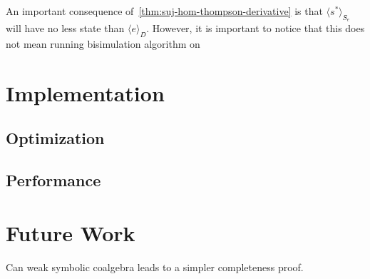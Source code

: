 \documentclass[conference]{IEEEtran}
\begin{document}
An important consequence of~\cref{thm:suj-hom-thompson-derivative} is that \(⟨s^*⟩_{Ŝ_{e}}\) will have no less state than \(⟨e⟩_{D̂}\).
However, it is important to notice that this does not mean running bisimulation algorithm on 

\section{Implementation}

\subsection{Optimization}\label{sec:optimization-implementation}

\subsection{Performance}\label{sec:performance-implementation}


\section{Future Work}

Can weak symbolic coalgebra leads to a simpler completeness proof.



\printbibliography

\newpage
\appendix
\end{document}
